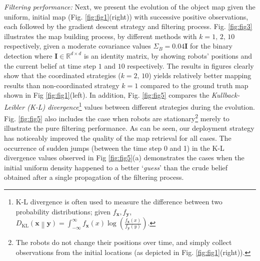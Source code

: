 \documentclass[journal]{IEEEtran}
\begin{document}
\textit{Filtering performance:}
Next, we present the evolution of the object map given the uniform, initial map (Fig. \ref{fig:fig1}(right)) with successive positive observations, each followed by the gradient descent strategy and filtering process. Fig. \ref{fig:fig3} illustrates the map building process, by different methods with $k=1,\,2,\,10$ respectively, given a moderate covariance values $\Sigma_B = 0.04\mathbf{I}$ for the binary detection where $\mathbf{I} \in \mathbb{R}^{d\times d}$ is an identity matrix, by showing robots' positions and the current belief at time step $1$ and $10$ respectively.
The results in figures clearly show that the coordinated strategies ($k=2,\,10$) yields relatively better mapping results than non-coordinated strategy $k=1$ compared to the ground truth map shown in Fig \ref{fig:fig1}(left).
In addition, Fig. \ref{fig:fig5} compares the \emph{Kullback-Leibler (K-L) divergence}\footnote{K-L divergence is often used to measure the difference between two probability distributions; given $f_{\bm{x}},f_{\bm{y}}$,
$D_{\text{KL}} \left( \bm{x} \middle\| \bm{y} \right) = \int_{-\infty}^{\infty} f_{\bm{x}}(x)\log\left(\frac{f_{\bm{x}}(x)}{f_{\bm{y}}(y)}\right) $.
} values 
between different strategies during the evolution. Fig. \ref{fig:fig5} also includes the case when robots are stationary\footnote{The robots do not change their positions over time, and simply collect observations from the initial locations (as depicted in Fig. \ref{fig:fig1}(right)).} merely to illustrate the pure filtering performance.  As can be seen, our deployment strategy has noticeably improved the quality of the map retrieval for all cases.
The occurrence of sudden jumps (between the time step 0 and 1) in the K-L divergence values observed in Fig \ref{fig:fig5}(a) demonstrates the cases when the initial uniform density happened to a better `\emph{guess}' than the crude belief obtained after a single propagation of the filtering process.
\end{document}
